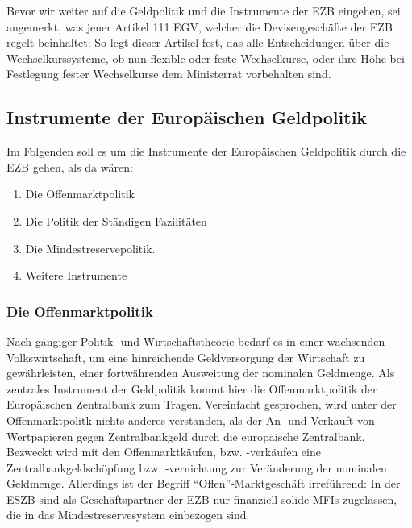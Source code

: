 \documentclass[
      onecolumn,
      a4paper,
      abstracton,
      parskip=half
      ,final
      ]{scrartcl}
\begin{document}
Bevor wir weiter auf die Geldpolitik und die Instrumente der \ac{EZB} eingehen, sei angemerkt, was jener Artikel 111 \ac{EGV}, welcher die Devisengesch{\"a}fte der \ac{EZB} regelt beinhaltet:
So legt dieser Artikel fest, das alle Entscheidungen {\"u}ber die Wechselkurssysteme, ob nun flexible oder feste Wechselkurse, oder ihre H{\"o}he bei Festlegung fester Wechselkurse dem Ministerrat vorbehalten sind.  \citep[vgl.][S.555]{Basseler2010}


\subsection{Instrumente der Europ{\"a}ischen Geldpolitik}

Im Folgenden soll es um die Instrumente der Europ{\"a}ischen Geldpolitik durch die \ac{EZB} gehen, als da w{\"a}ren:
\begin{enumerate}
  \item{Die Offenmarktpolitik}
  \item{Die Politik der St{\"a}ndigen Fazilit{\"a}ten}
  \item{Die Mindestreservepolitik.}
  \item{Weitere Instrumente}
\end{enumerate}

\subsubsection{Die Offenmarktpolitik}
Nach g{\"a}ngiger Politik- und Wirtschaftstheorie bedarf es in einer wachsenden Volkswirtschaft, um eine hinreichende Geldversorgung der Wirtschaft zu gew{\"a}hrleisten, einer fortw{\"a}hrenden Ausweitung der nominalen Geldmenge. Als zentrales Instrument der Geldpolitik kommt hier die Offenmarktpolitik der Europ{\"a}ischen Zentralbank zum Tragen.
Vereinfacht gesprochen, wird unter der Offenmarktpolitk nichts anderes verstanden, als der An- und Verkauft von Wertpapieren gegen Zentralbankgeld durch die europ{\"a}ische Zentralbank. Bezweckt wird mit den Offenmarktk{\"a}ufen, bzw. -verk{\"a}ufen eine Zentralbankgeldsch{\"o}pfung bzw. -vernichtung zur Ver{\"a}nderung der nominalen Geldmenge. Allerdings ist der Begriff "`Offen"'-Marktgesch{\"a}ft irref{\"u}hrend: In der \ac{ESZB} sind als Gesch{\"a}ftspartner der \ac{EZB} nur finanziell solide MFIs zugelassen, die in das Mindestreservesystem einbezogen sind.
\end{document}
